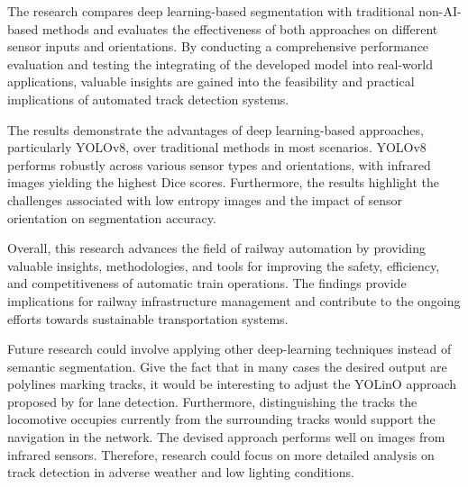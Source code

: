 \documentclass[Master,MDS,english]{BASE/twbook} %
\begin{document}
The research compares deep learning-based segmentation with traditional non-AI-based methods and evaluates the effectiveness of both approaches on different sensor inputs and orientations. By conducting a comprehensive performance evaluation and testing the integrating of the developed model into real-world applications, valuable insights are gained into the feasibility and practical implications of automated track detection systems.

The results demonstrate the advantages of deep learning-based approaches, particularly YOLOv8, over traditional methods in most scenarios. YOLOv8 performs robustly across various sensor types and orientations, with infrared images yielding the highest Dice scores. Furthermore, the results highlight the challenges associated with low entropy images and the impact of sensor orientation on segmentation accuracy.

Overall, this research advances the field of railway automation by providing valuable insights, methodologies, and tools for improving the safety, efficiency, and competitiveness of automatic train operations. The findings provide implications for railway infrastructure management and contribute to the ongoing efforts towards sustainable transportation systems.

Future research could involve applying other deep-learning techniques instead of semantic segmentation. Give the fact that in many cases the desired output are polylines marking tracks, it would be interesting to adjust the YOLinO approach proposed by \cite{meyer2021yolino} for lane detection. Furthermore, distinguishing the tracks the locomotive occupies currently from the surrounding tracks would support the navigation in the network. 
The devised approach performs well on images from infrared sensors. Therefore, research could focus on more detailed analysis on track detection in adverse weather and low lighting conditions. 










\clearpage                                                       %

\end{document}
